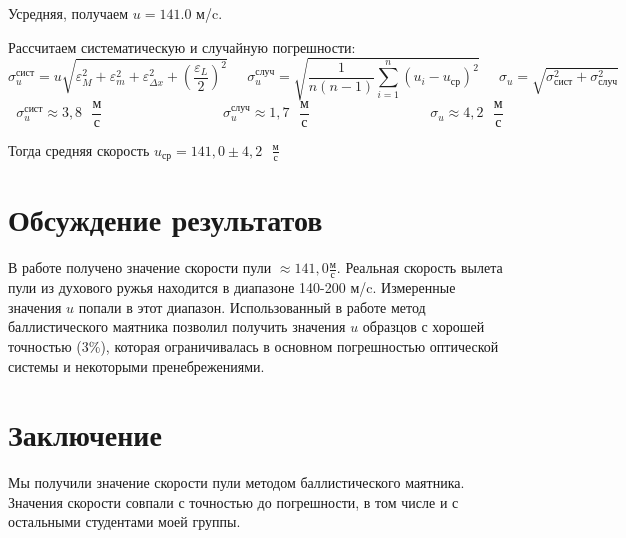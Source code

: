 \documentclass[
	a4paper, %
	12pt, %
]{article}
\begin{document}
	Усредняя, получаем $u=141.0$ м/c.
	
	Рассчитаем систематическую и случайную погрешности:
	\begin{equation}
		\sigma_u^{\text{сист}} =u \sqrt{\varepsilon_M^2 + \varepsilon_m^2 + \varepsilon_{\Delta x}^2 + \left(\frac{\varepsilon_L}{2} \right)^2}  \;\;\;\;\; \sigma_u^{\text{случ}} = \sqrt{ \frac{1}{n(n-1)} \sum_{i=1}^{n}(u_i - u_{\text{ср}})^2} \;\;\;\;\; \sigma_u =\sqrt{\sigma_{\text{сист}}^2 + \sigma_\text{случ}^2} 
	\end{equation}
	\begin{equation}
		\sigma_u^\text{сист}\approx 3,8 \text{ }\dfrac{\text{м}}{\text{с}} \;\;\;\;\;\;\;\;\;\;\;\;\;\;\;\;\;\;\;\;\;\;\;\;\;\;\;\;\;\;\; \sigma_u^\text{случ}\approx 1,7 \text{ }\dfrac{\text{м}}{\text{с}} \;\;\;\;\;\;\;\;\;\;\;\;\;\;\;\;\;\;\;\;\;\;\;\;\;\;\;\;\;\;\;
		\sigma_u \approx 4,2 \text{ }\dfrac{\text{м}}{\text{с}}
	\end{equation}
	
	Тогда средняя скорость $u_\text{ср} = 141,0 \pm 4,2\text{ }\frac{\text{м}}{\text{с}} $
	
	\section{Обсуждение результатов}
	В работе получено значение скорости пули $\approx 141,0 \frac{\text{м}}{\text{с}}$. Реальная скорость вылета пули из духового ружья находится в диапазоне 140-200 м/c. Измеренные значения $u$ попали в этот диапазон.
	Использованный в работе метод баллистического маятника позволил получить значения $u$ образцов с хорошей точностью ({3}\%), которая ограничивалась в основном погрешностью оптической системы и некоторыми пренебрежениями.
	\section{Заключение}
	Мы получили значение скорости пули методом баллистического маятника. Значения скорости совпали с точностью до погрешности, в том числе и с остальными студентами моей группы.
	
	
\end{document}
